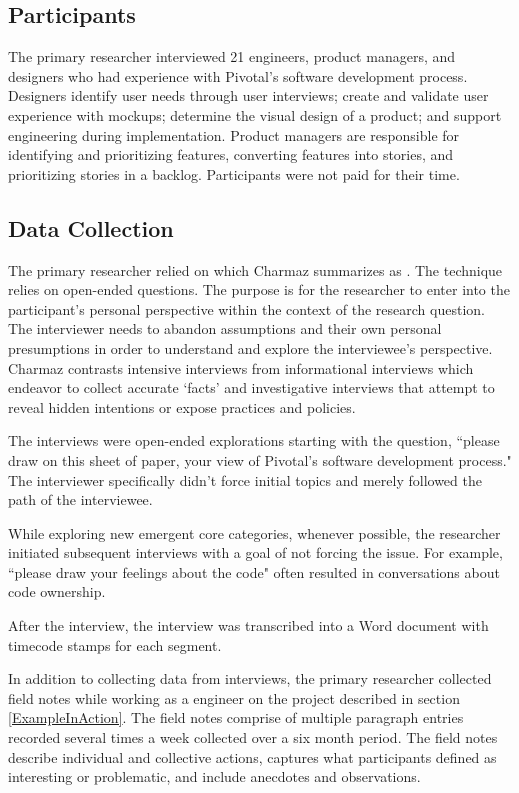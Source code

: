 \subsection{Participants}
The primary researcher interviewed 21 engineers, product managers, and designers who had experience with Pivotal's software development process. Designers identify user needs through user interviews; create and validate user experience with mockups; determine the visual design of a product; and support engineering during implementation. Product managers are responsible for identifying and prioritizing features, converting features into stories, and prioritizing stories in a backlog.  Participants were not paid for their time. 
\subsection{Data Collection}
The primary researcher relied on  which Charmaz summarizes as  \cite{Charmaz}. The technique relies on open-ended questions. The purpose is for the researcher to enter into the participant's personal perspective within the context of the research question. The interviewer needs to abandon assumptions and their own personal presumptions in order to understand and explore the interviewee's perspective. Charmaz \cite{Charmaz} contrasts intensive interviews from informational interviews which endeavor to collect accurate `facts' and investigative interviews that attempt to reveal hidden intentions or expose practices and policies. 
 
The interviews were open-ended explorations starting with the question, ``please draw on this sheet of paper, your view of Pivotal's software development process." The interviewer specifically didn't force initial topics and merely followed the path of the interviewee. 

While exploring new emergent core categories, whenever possible, the researcher initiated subsequent interviews with a goal of not forcing the issue. For example, ``please draw your feelings about the code" often resulted in conversations about code ownership. 

After the interview, the interview was transcribed into a Word document with timecode stamps for each segment.

In addition to collecting data from interviews, the primary researcher collected field notes while working as a engineer on the project described in section \ref{ExampleInAction}. The field notes comprise of multiple paragraph entries recorded several times a week collected over a six month period. The field notes describe individual and collective actions, captures what participants defined as interesting or problematic, and include anecdotes and observations. 
